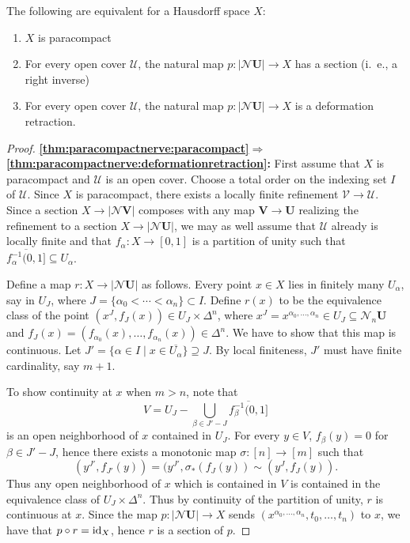 \documentclass[a4paper,openany]{scrbook}
\newcommand{\nerve}{\mathcal N}
\begin{document}
\begin{thm}\label{thm:paracompactnerve}
The following are equivalent for a Hausdorff space $X$:
\begin{enumerate}
\item $X$ is paracompact\label{thm:paracompactnerve:paracompact}
\item For every open cover $\mathcal U$, the natural map $p\colon |\nerve \mathbf U| \to X$ has a section (i.~e., a right inverse)\label{thm:paracompactnerve:section}
\item For every open cover $\mathcal U$, the natural map $p\colon |\nerve \mathbf U| \to X$ is a deformation retraction.\label{thm:paracompactnerve:deformationretraction}
\end{enumerate}
\end{thm}
\begin{proof}
\noindent\textbf{\eqref{thm:paracompactnerve:paracompact}$\Longrightarrow$\eqref{thm:paracompactnerve:deformationretraction}:}
First assume that $X$ is paracompact and $\mathcal U$ is an open cover. Choose a total order on the indexing set $I$ of $\mathcal U$. Since $X$ is paracompact, there exists a locally finite refinement $\mathcal V \to \mathcal U$. Since a section $X \to |\nerve\mathbf V|$ composes with any map $\mathbf V \to \mathbf U$ realizing the refinement to a section $X \to |\nerve\mathbf U|$,  we may as well assume that $\mathcal U$ already is locally finite and that $f_\alpha\colon X \to [0,1]$ is a partition of unity such that $\overline{f_\alpha^{-1}(0,1]} \subseteq U_\alpha$.

Define a map $r\colon X \to |\nerve\mathbf U|$ as follows. Every point $x \in X$ lies in finitely many $U_\alpha$, say in $U_J$, where $J=\{\alpha_0 < \cdots < \alpha_n\} \subset I$. Define $r(x)$ to be the equivalence class of the point $(x^J,f_J(x)) \in U_J \times \Delta^n$, where $x^J = x^{\alpha_0,\dots,\alpha_n} \in U_J \subseteq \nerve_n\mathbf U$ and $f_J(x)=(f_{\alpha_0}(x),\dots,f_{\alpha_n}(x)) \in \Delta^n$. We have to show that this map is continuous. Let $J' = \{\alpha \in I \mid x \in \overline{U_\alpha}\} \supseteq J$. By local finiteness, $J'$ must have finite cardinality, say $m+1$. 

To show continuity at $x$ when $m>n$, note that
\[
V = U_J - \bigcup_{\beta \in J'-J} \overline{f_\beta^{-1}(0,1]}
\]
is an open neighborhood of $x$ contained in $U_J$. For every $y \in V$, $f_{\beta}(y) = 0$ for $\beta \in J'-J$, hence there exists a monotonic map $\sigma\colon [n] \to [m]$ such that
\[
(y^{J'},f_{J'}(y)) = (y^{J'},\sigma_*(f_J(y)) \sim (y^J,f_J(y)).
\]
Thus any open neighborhood of $x$ which is contained in $V$ is contained in the equivalence class of $U_J \times \Delta^n$. Thus by continuity of the partition of unity, $r$ is continuous at $x$. Since the map $p\colon |\nerve \mathbf U| \to X$ sends $(x^{\alpha_0,\dots,\alpha_n},t_0,\dots,t_n)$ to $x$, we have that $p \circ r = \operatorname{id}_X$, hence $r$ is a section of $p$.


\end{proof}
\end{document}
